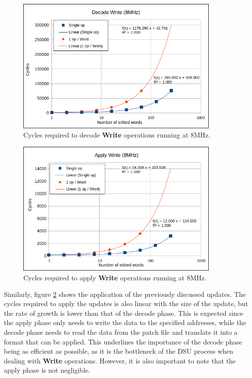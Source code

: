 \begin{figure}[!ht]
    \centering
    \includegraphics[width=0.9\textwidth]{img/WDecode8.png}
    \caption{Cycles required to decode \textbf{Write} operations running at 8MHz.}
    \label{fig:wDecode8}
\end{figure}
\begin{figure}[!ht]
    \centering
    \includegraphics[width=0.9\textwidth]{img/wApply8.png}
    \caption{Cycles required to apply \textbf{Write} operations running at 8MHz.}
    \label{fig:wApply8}
\end{figure}
Similarly, figure \ref{fig:wApply8} shows the application of the previously discussed updates. The cycles required to apply the updates is also linear with the size of the update, but the rate of growth is lower than that of the decode phase. This is expected since the apply phase only needs to write the data to the specified addresses, while the decode phase needs to read the data from the patch file and translate it into a format that can be applied. This underlines the importance of the decode phase being as efficient as possible, as it is the bottleneck of the DSU process when dealing with \textbf{Write} operations. However, it is also important to note that the apply phase is not negligible. 

